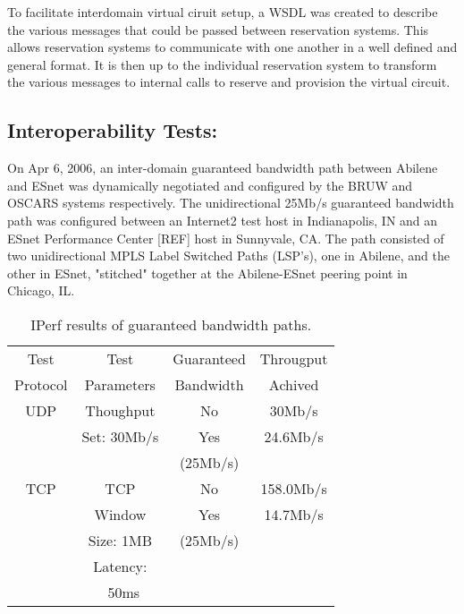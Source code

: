 \documentclass[conference]{IEEEtran}
\begin{document}
To facilitate interdomain virtual ciruit setup, 
a WSDL was created to describe the various
messages that could be passed between reservation systems. This allows
reservation systems to communicate with one another in a
well defined and general format. It is then up to the individual reservation 
system to 
transform the various messages to internal calls to reserve and provision the 
virtual circuit.

\subsection{Interoperability Tests: }

On Apr 6, 2006, an inter-domain guaranteed bandwidth path between Abilene and 
ESnet was dynamically negotiated and configured by the BRUW and OSCARS systems 
respectively. The unidirectional 25Mb/s guaranteed bandwidth path was 
configured between an Internet2 test host in Indianapolis, IN and an ESnet 
Performance Center [REF] host in Sunnyvale, CA.  The path consisted of two 
unidirectional MPLS Label Switched Paths (LSP's), one in Abilene, and the 
other in ESnet, "stitched" together at the Abilene-ESnet peering point in 
Chicago, IL.

\begin{table}
 \centering
 {\scriptsize
 \begin{tabular}{|c|c|c|c|}
 \hline
 Test     & Test       & Guaranteed & Througput  \\ 
 Protocol & Parameters & Bandwidth  & Achived    \\ \hline \hline 
 UDP      & Thoughput  & No         &   30Mb/s   \\ \cline{3-4}
          & Set: 30Mb/s& Yes        &   24.6Mb/s \\ 
          &            & (25Mb/s)   &            \\ \hline 
 TCP      & TCP        & No         & 158.0Mb/s  \\ \cline{3-4}
          & Window     & Yes        &  14.7Mb/s  \\ 
          & Size: 1MB  & (25Mb/s)   &            \\ 
          & Latency:   &            &            \\ 
          & ~50ms      &            &            \\ \hline
 \end{tabular}
 }
 \caption{IPerf results of guaranteed bandwidth paths.}
 \label{tab:bandwidth}
\end{table}
\end{document}
